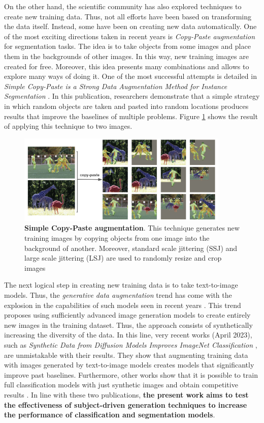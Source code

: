 On the other hand, the scientific community has also explored techniques to create new training data. Thus, not all efforts have been based on transforming the data itself. Instead, some have been on creating new data automatically. One of the most exciting directions taken in recent years is \textit{Copy-Paste augmentation} for segmentation tasks. The idea is to take objects from some images and place them in the backgrounds of other images. In this way, new training images are created for free. Moreover, this idea presents many combinations and allows to explore many ways of doing it. One of the most successful attempts is detailed in \textit{Simple Copy-Paste is a Strong Data Augmentation Method for Instance Segmentation} \cite{ghiasi2021simple}. In this publication, researchers demonstrate that a simple strategy in which random objects are taken and pasted into random locations produces results that improve the baselines of multiple problems. Figure \ref{fig:copy-paste} shows the result of applying this technique to two images.

\begin{figure}
    \centering
    \includegraphics[width=0.9\textwidth]{Pictures/copy-paste.png} 
    \caption{\textbf{Simple Copy-Paste augmentation}. This technique generates new training images by copying objects from one image into the background of another. Moreover, standard scale jittering (SSJ) and large scale jittering (LSJ) are used to randomly resize and crop images \cite{ghiasi2021simple}}
    \label{fig:copy-paste}
\end{figure}

The next logical step in creating new training data is to take text-to-image models. Thus, the \textit{generative data augmentation} trend has come with the explosion in the capabilities of such models seen in recent years \cite{rombach2022high, dhariwal2021diffusion}. This trend proposes using sufficiently advanced image generation models to create entirely new images in the training dataset. Thus, the approach consists of synthetically increasing the diversity of the data. In this line, very recent works (April 2023), such as \textit{Synthetic Data from Diffusion Models Improves ImageNet Classification} \cite{azizi2023synthetic}, are unmistakable with their results. They show that augmenting training data with images generated by text-to-image models creates models that significantly improve past baselines. Furthermore, other works show that it is possible to train full classification models with just synthetic images and obtain competitive results \cite{sariyildiz2023fake}. In line with these two publications, \textbf{the present work aims to test the effectiveness of subject-driven generation techniques to increase the performance of classification and segmentation models}.